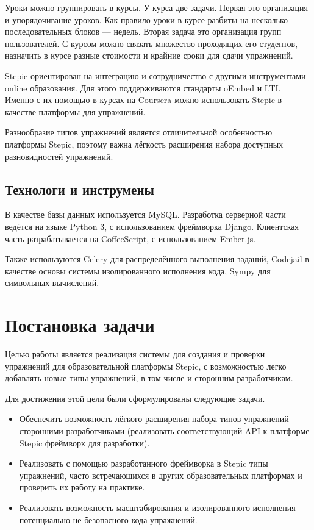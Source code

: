 \documentclass{matmex-diploma-custom}
\begin{document}
Уроки можно группировать в курсы. У курса две задачи. Первая это
организация и упорядочивание уроков. Как правило уроки в курсе разбиты
на несколько последовательных блоков --- недель. Вторая задача это
организация групп пользователей. С курсом можно связать множество
проходящих его студентов, назначить в курсе разные стоимости и крайние
сроки для сдачи упражнений.

Stepic ориентирован на интеграцию и сотрудничество с другими инструментами
online образования. Для этого поддерживаются стандарты oEmbed и
LTI. Именно с их помощью в курсах на Coursera можно использовать
Stepic в качестве платформы для упражнений.

Разнообразие типов упражнений является отличительной особенностью
платформы Stepic, поэтому важна лёгкость расширения набора доступных
разновидностей упражнений.

\subsection{Технологи и инструмены}
В качестве базы данных используется MySQL. Разработка серверной части
ведётся на языке Python 3, с использованием фреймворка
Django. Клиентская часть разрабатывается на CoffeeScript, с
использованием Ember.js.

Также используются Celery для распределённого выполнения заданий,
Codejail в качестве основы системы изолированного исполнения кода,
Sympy для символьных вычислений.

\section{Постановка задачи}
Целью работы является реализация системы для создания и проверки
упражнений для образовательной платформы Stepic, с возможностью легко
добавлять новые типы упражнений, в том числе и сторонним
разработчикам.

Для достижения этой цели были сформулированы следующие задачи.

\begin{itemize}
\item Обеспечить возможность лёгкого расширения набора типов
  упражнений сторонними разработчиками (реализовать соответствующий
  API к платформе Stepic фреймворк для разработки).
\item Реализовать с помощью разработанного фреймворка в Stepic типы
  упражнений, часто встречающихся в других образовательных платформах
  и проверить их работу на практике.
\item Реализовать возможность масштабирования и изолированного
  исполнения потенциально не безопасного кода упражнений.
\end{itemize}
\end{document}
